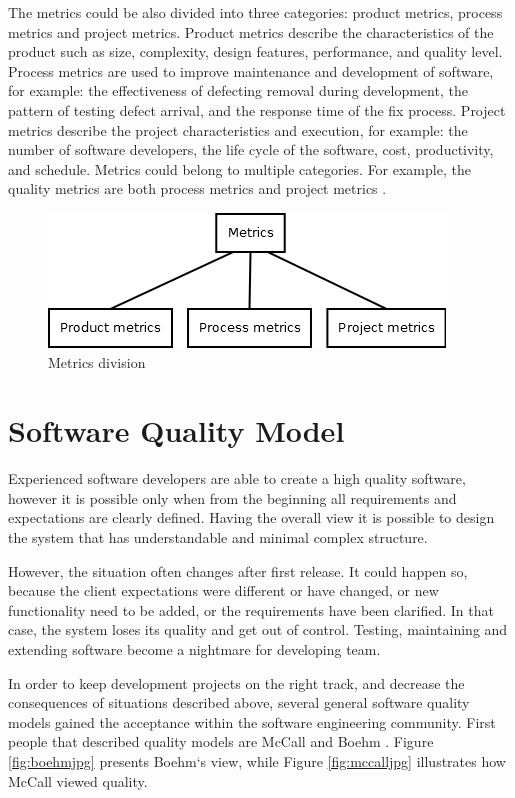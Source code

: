 The metrics could be also divided into three categories: product metrics, process metrics and project metrics. Product metrics describe the characteristics of the product such as size, complexity, design features, performance, and quality level. Process metrics are used to improve maintenance and development of software, for example: the effectiveness of defecting removal during development, the pattern of testing defect arrival, and the response time of the fix process. Project metrics describe the project characteristics and execution, for example: the number of software developers, the life cycle of the software, cost, productivity, and schedule. Metrics could belong to multiple categories. For example, the quality metrics are both process metrics and project metrics \cite{metrics}. 

\begin{figure}[h!]
	\centering
	\includegraphics[scale=0.5]{img/Diagram2.png} 
	\caption{Metrics division}		
	\label{fig:metrics2}
\end{figure}


\section{Software Quality Model}
Experienced software developers are able to create a high quality software, however it is possible only when from the beginning all requirements and expectations are clearly defined. Having the overall view it is possible to design the system that has understandable and minimal complex structure. 

However, the situation often changes after first release. It could happen so, because the client expectations were different or have changed, or new functionality need to be added, or the requirements have been clarified. In that case, the system loses its quality and get out of control. Testing, maintaining and extending software become a nightmare for developing team. 

In order to keep development projects on the right track, and decrease the consequences of situations described above, several general software quality models gained the acceptance within the software engineering community. First people that described quality models are McCall and Boehm \cite{rigorous}. Figure \ref{fig:boehmjpg} presents Boehm`s view, while Figure \ref{fig:mccalljpg} illustrates how McCall viewed quality.

